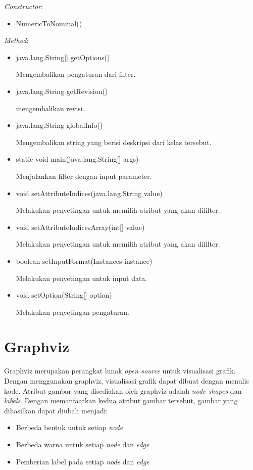 \textsl{Constructor}:
\begin{itemize}
	\item NumericToNominal()
\end{itemize}
\textsl{Method}:
\begin{itemize}
	
	\item java.lang.String[] getOptions()
	
	Mengembalikan pengaturan dari filter.
	
	\item java.lang.String getRevision()
	
	mengembalikan revisi.
	
	\item java.lang.String globalInfo()
	
	Mengembalikan string yang berisi deskripsi dari kelas tersebut.
	
	\item static void main(java.lang.String[] args)	
	
	Menjalankan filter dengan input parameter.
	
	\item void setAttributeIndices(java.lang.String value)
	
	Melakukan penyetingan untuk memilih atribut yang akan difilter.
	
	\item void setAttributeIndicesArray(int[] value)
	
	Melakukan penyetingan untuk memilih atribut yang akan difilter.
	
	\item boolean setInputFormat(Instances instance)
	
	Melakukan penyetingan untuk input data.
	
	\item void setOption(String[] option)
	
	Melakukan penyetingan pengaturan.
\end{itemize}

\section{Graphviz}\cite{Graph}
Graphviz merupakan perangkat lunak \textsl{open source} untuk visualisasi grafik. Dengan menggunakan graphviz, visualisasi grafik dapat dibuat dengan menulis kode. Atribut gambar yang disediakan oleh graphviz adalah \textsl{node shapes} dan \textsl{labels}. Dengan memanfaatkan kedua atribut gambar tersebut, gambar yang dihasilkan dapat diubah menjadi:
\begin{itemize}
	\item Berbeda bentuk untuk setiap \textsl{node}
	\item Berbeda warna untuk setiap \textsl{node} dan \textsl{edge}
	\item Pemberian label pada setiap \textsl{node} dan \textsl{edge}
\end{itemize}

